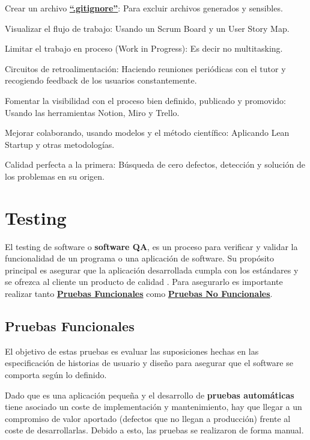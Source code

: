 \documentclass[12pt,twoside,titlepage]{report}
\begin{document}
\begin{compactitem}
    \item Crear un archivo \href{https://github.com/alberttogoca/EarFit/blob/main/.gitignore}{\textbf{``.gitignore''}}: Para excluir archivos generados y sensibles.
    \item Visualizar el flujo de trabajo: Usando un Scrum Board y un User Story Map.
    \item Limitar el trabajo en proceso (Work in Progress): Es decir no multitasking.
    \item Circuitos de retroalimentación: Haciendo reuniones periódicas con el tutor y recogiendo feedback de los usuarios constantemente.
    \item Fomentar la visibilidad con el proceso bien definido, publicado y promovido: Usando las herramientas Notion, Miro y Trello.
    \item Mejorar colaborando, usando modelos y el método científico: Aplicando Lean Startup y otras metodologías.
    \item Calidad perfecta a la primera: Búsqueda de cero defectos, detección y solución de los problemas en su origen.
\end{compactitem}

\section{Testing}
\label{sec:pruebas}

El testing de software o \textbf{software QA}, es un proceso para verificar y validar la funcionalidad de un programa o una aplicación de software. Su propósito principal es asegurar que la aplicación desarrollada cumpla con los estándares y se ofrezca al cliente un producto de calidad
\cite{testing}. Para asegurarlo es importante realizar tanto \hyperref[sec:funcionales]{\textbf{Pruebas Funcionales}} como \hyperref[sec:nofuncionales]{\textbf{Pruebas No Funcionales}}.

\subsection{Pruebas Funcionales}
\label{sec:funcionales}

El objetivo de estas pruebas es evaluar las suposiciones hechas en las especificación de historias de usuario y diseño para asegurar que el software se comporta según lo definido.

Dado que es una aplicación pequeña y el desarrollo de \textbf{pruebas automáticas} tiene asociado un coste de implementación y mantenimiento, hay que llegar a un compromiso de valor aportado (defectos que no llegan a producción) frente al coste de desarrollarlas. Debido a esto, las pruebas se realizaron de forma manual. 
\end{document}

